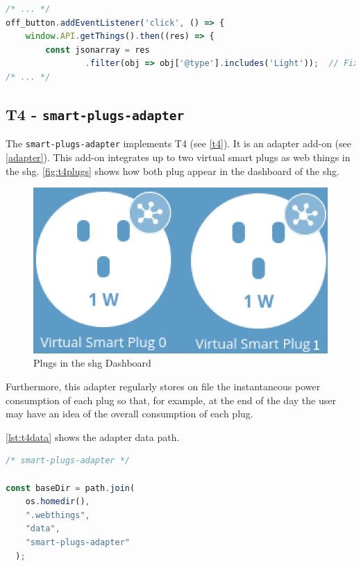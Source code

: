 \begin{lstlisting}[language=JavaScript, label=lst:t3fix, caption=T3 - Array Fixing]
/* ... */
off_button.addEventListener('click', () => {
    window.API.getThings().then((res) => {
        const jsonarray = res
                .filter(obj => obj['@type'].includes('Light'));  // Fix: filtering
/* ... */    
\end{lstlisting}


\subsection{T4 - \texttt{smart-plugs-adapter}}
\label{t4poc}

The \texttt{smart-plugs-adapter} implements T4 (see \autoref{t4}). It is an adapter add-on (see \autoref{adapter}). This add-on integrates up to two virtual smart plugs as \glspl{web thing} in the \gls{shg}. \autoref{fig:t4plugs} shows how both plug appear in the dashboard of the \gls{shg}.

\begin{figure}[H]
    \centering
    \includegraphics[scale=0.75]{images/addons/simple-plugs.png}
    \caption{Plugs in the \gls{shg} Dashboard}
    \label{fig:t4plugs}
\end{figure}

Furthermore, this adapter regularly stores on file the instantaneous power consumption of each plug so that, for example, at the end of the day the user may have an idea of the overall consumption of each plug.

 \autoref{lst:t4data} shows the adapter data path.

\begin{lstlisting}[language=JavaScript, label=lst:t4data, caption=T4 - \texttt{smart-plugs-adapter} data path]
/* smart-plugs-adapter */

const baseDir = path.join(
    os.homedir(),
    ".webthings",
    "data",
    "smart-plugs-adapter"
  );
\end{lstlisting}


